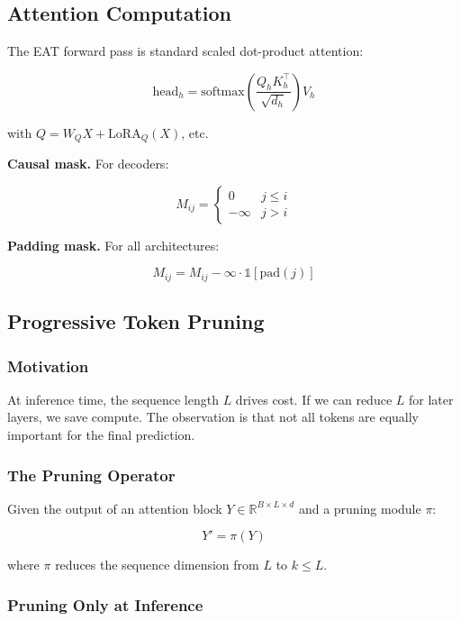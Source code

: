 \subsection{Attention Computation}

The EAT forward pass is standard scaled dot-product attention:

\[
\text{head}_h = \text{softmax}\!\left(\frac{Q_h K_h^\top}{\sqrt{d_h}}\right) V_h
\tag{4.2}
\]

with $Q = W_Q X + \text{LoRA}_Q(X)$, etc.

\textbf{Causal mask.} For decoders:

\[
M_{ij} = \begin{cases} 0 & j \leq i \\ -\infty & j > i \end{cases}
\tag{4.3}
\]

\textbf{Padding mask.} For all architectures:

\[
M_{ij} = M_{ij} - \infty \cdot \mathbb{1}[\text{pad}(j)]
\tag{4.4}
\]

\subsection{Progressive Token Pruning}

\subsubsection{Motivation}

At inference time, the sequence length $L$ drives cost. If we can reduce $L$ 
for later layers, we save compute. The observation is that not all tokens 
are equally important for the final prediction.

\subsubsection{The Pruning Operator}

Given the output of an attention block $Y \in \mathbb{R}^{B \times L \times d}$ 
and a pruning module $\pi$:

\[
Y' = \pi(Y)
\tag{4.5}
\]

where $\pi$ reduces the sequence dimension from $L$ to $k \leq L$.

\subsubsection{Pruning Only at Inference}

